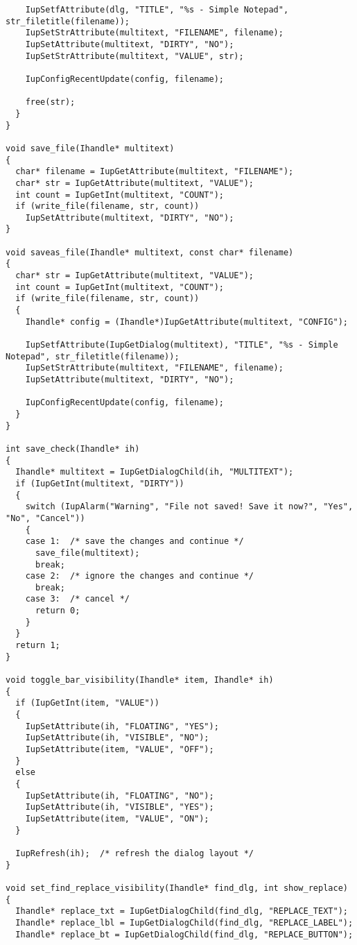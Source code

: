 \documentclass{ctexart}
\begin{document}
\begin{lstlisting}
    IupSetfAttribute(dlg, "TITLE", "%s - Simple Notepad", str_filetitle(filename));
    IupSetStrAttribute(multitext, "FILENAME", filename);
    IupSetAttribute(multitext, "DIRTY", "NO");
    IupSetStrAttribute(multitext, "VALUE", str);

    IupConfigRecentUpdate(config, filename);

    free(str);
  }
}

void save_file(Ihandle* multitext)
{
  char* filename = IupGetAttribute(multitext, "FILENAME");
  char* str = IupGetAttribute(multitext, "VALUE");
  int count = IupGetInt(multitext, "COUNT");
  if (write_file(filename, str, count))
    IupSetAttribute(multitext, "DIRTY", "NO");
}

void saveas_file(Ihandle* multitext, const char* filename)
{
  char* str = IupGetAttribute(multitext, "VALUE");
  int count = IupGetInt(multitext, "COUNT");
  if (write_file(filename, str, count))
  {
    Ihandle* config = (Ihandle*)IupGetAttribute(multitext, "CONFIG");
  
    IupSetfAttribute(IupGetDialog(multitext), "TITLE", "%s - Simple Notepad", str_filetitle(filename));
    IupSetStrAttribute(multitext, "FILENAME", filename);
    IupSetAttribute(multitext, "DIRTY", "NO");

    IupConfigRecentUpdate(config, filename);
  }
}

int save_check(Ihandle* ih)
{
  Ihandle* multitext = IupGetDialogChild(ih, "MULTITEXT");
  if (IupGetInt(multitext, "DIRTY"))
  {
    switch (IupAlarm("Warning", "File not saved! Save it now?", "Yes", "No", "Cancel"))
    {
    case 1:  /* save the changes and continue */
      save_file(multitext);
      break;
    case 2:  /* ignore the changes and continue */
      break;
    case 3:  /* cancel */
      return 0;  
    }
  }
  return 1;
}

void toggle_bar_visibility(Ihandle* item, Ihandle* ih)
{
  if (IupGetInt(item, "VALUE"))
  {
    IupSetAttribute(ih, "FLOATING", "YES");
    IupSetAttribute(ih, "VISIBLE", "NO");
    IupSetAttribute(item, "VALUE", "OFF");
  }
  else
  {
    IupSetAttribute(ih, "FLOATING", "NO");
    IupSetAttribute(ih, "VISIBLE", "YES");
    IupSetAttribute(item, "VALUE", "ON");
  }

  IupRefresh(ih);  /* refresh the dialog layout */
}

void set_find_replace_visibility(Ihandle* find_dlg, int show_replace)
{
  Ihandle* replace_txt = IupGetDialogChild(find_dlg, "REPLACE_TEXT");
  Ihandle* replace_lbl = IupGetDialogChild(find_dlg, "REPLACE_LABEL");
  Ihandle* replace_bt = IupGetDialogChild(find_dlg, "REPLACE_BUTTON");


\end{lstlisting}
\end{document}
